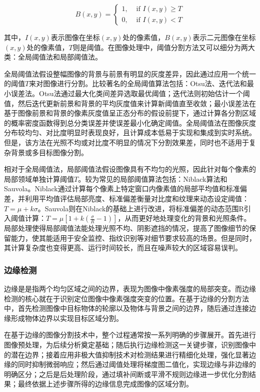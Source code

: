 \begin{equation}
B(x, y)=\left\{\begin{array}{ll}1, & \text { if } I(x, y) \geq T \\ 0, & \text { if } I(x, y)<T\end{array}\right.
\end{equation}

其中，$I(x, y)$表示图像在坐标$(x, y)$处的像素值，$B(x, y)$表示二元图像在坐标$(x, y)$处的像素值，$T$则是阈值。在图像处理中，阈值分割方法又可以细分为两大类：全局阈值法和局部阈值法。

全局阈值法假设整幅图像的背景与前景有明显的灰度差异，因此通过应用一个统一的阈值$T$来对图像进行分割。比较著名的全局阈值算法包括：Otsu法、迭代法和最小误差法。Otsu法通过最大化类间差异选取最优阈值；迭代法则初始估计一个阈值，然后迭代更新前景和背景的平均灰度值来计算新阈值直至收敛；最小误差法在基于图像前景和背景的像素灰度值呈正态分布的假设前提下，通过计算各分割区域的概率密度函数得到总分类误差并使误差最小化确定阈值。全局阈值法在图像灰度分布较均匀、对比度明显时表现良好，且计算成本低易于实现和集成到实时系统。但是，该方法在光照不均或对比度不明显的情况下分割效果差，同时也不适用于复杂背景或多目标图像分割。

相对于全局阈值法，局部阈值法假设图像具有不均匀的光照，因此针对每个像素的局部领域单独计算阈值$T$。较为常见的局部阈值算法包括：Niblack算法和Sauvola。Niblack通过计算每个像素上特定窗口内像素值的局部平均值和标准偏差，并利用平均值评估局部亮度、标准偏差衡量对比度和纹理来动态设定阈值：$ T=\mu+k \sigma $。Sauvola则在Niblack的基础上进行改进，将标准偏差的动态范围R引入阈值计算：$ T=\mu\left[1+k\left(\frac{\sigma}{R}-1\right)\right] $，从而更好地处理变化的背景和光照条件。局部处理使得局部阈值法能处理光照不均、阴影遮挡的情况，提高了图像细节的保留能力，使其能适用于安全监控、指纹识别等对细节要求较高的场景。但是同时，其计算复杂度也变得更高、运行时间较长，而且在噪声较大的区域容易误判。

\subsubsection{边缘检测}


边缘是是指两个均匀区域之间的边界，表现为图像中像素强度的局部突变。而边缘检测的核心就在于识别定位图像中像素强度突变的位置。在基于边缘的分割方法中，首先检测图像中目标物体的轮廓以及物体与背景之间的边界，随后通过连接边缘形成物体边界以实现目标区域分割。

在基于边缘的图像分割技术中，整个过程通常按一系列明确的步骤展开。首先进行图像预处理，为后续分析奠定基础；随后执行边缘检测这一关键步骤，识别图像中的潜在边界；接着应用非极大值抑制技术对检测结果进行精细化处理，强化显著边缘的同时抑制微弱响应；然后通过阈值处理将梯度图二值化，实现边缘与非边缘的明确区分；之后是后处理阶段，通过填补间断或平滑不规则边缘进一步优化分割结果；最终依据上述步骤所得的边缘信息完成图像的区域分割。

